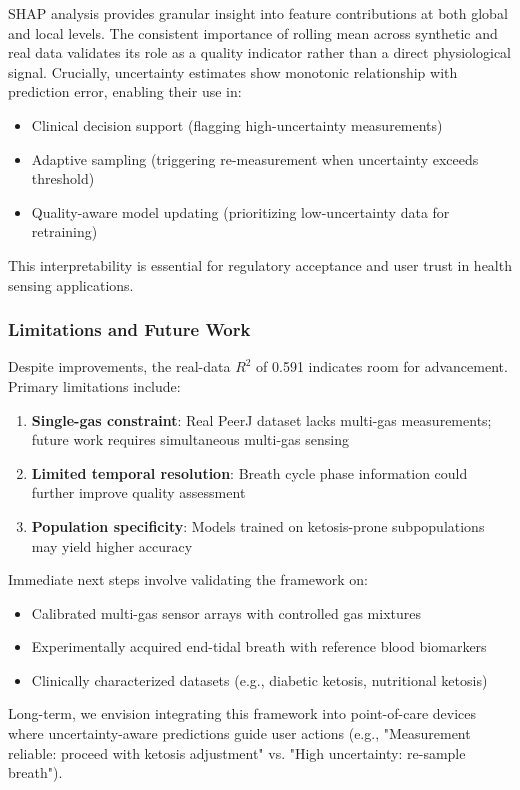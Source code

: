 \documentclass{ieeeaccess}
\begin{document}
SHAP analysis provides granular insight into feature contributions at both global and local levels. The consistent importance of rolling mean across synthetic and real data validates its role as a quality indicator rather than a direct physiological signal. Crucially, uncertainty estimates show monotonic relationship with prediction error, enabling their use in:
\begin{itemize}
\item Clinical decision support (flagging high-uncertainty measurements)
\item Adaptive sampling (triggering re-measurement when uncertainty exceeds threshold)
\item Quality-aware model updating (prioritizing low-uncertainty data for retraining)
\end{itemize}
This interpretability is essential for regulatory acceptance and user trust in health sensing applications.

\subsubsection{Limitations and Future Work}

Despite improvements, the real-data $R^2$ of 0.591 indicates room for advancement. Primary limitations include:
\begin{enumerate}
\item \textbf{Single-gas constraint}: Real PeerJ dataset lacks multi-gas measurements; future work requires simultaneous multi-gas sensing
\item \textbf{Limited temporal resolution}: Breath cycle phase information could further improve quality assessment
\item \textbf{Population specificity}: Models trained on ketosis-prone subpopulations may yield higher accuracy
\end{enumerate}
Immediate next steps involve validating the framework on:
\begin{itemize}
\item Calibrated multi-gas sensor arrays with controlled gas mixtures
\item Experimentally acquired end-tidal breath with reference blood biomarkers
\item Clinically characterized datasets (e.g., diabetic ketosis, nutritional ketosis)
\end{itemize}
Long-term, we envision integrating this framework into point-of-care devices where uncertainty-aware predictions guide user actions (e.g., "Measurement reliable: proceed with ketosis adjustment" vs. "High uncertainty: re-sample breath").
\end{document}
